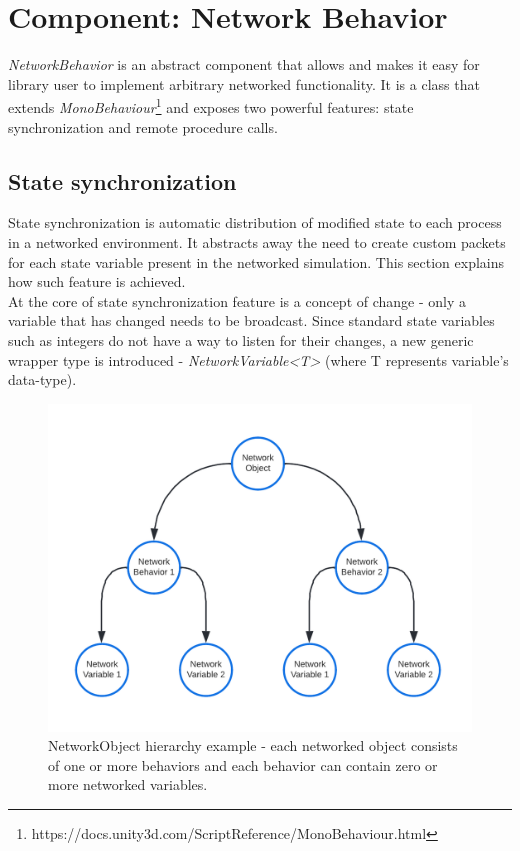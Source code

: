\documentclass[times, utf8, diplomski]{fer}
\begin{document}
\section{Component: Network Behavior}
\textit{NetworkBehavior} is an abstract component that allows and makes it easy for library user to implement arbitrary networked functionality. It is a class that extends \textit{MonoBehaviour}\footnote{https://docs.unity3d.com/ScriptReference/MonoBehaviour.html} and exposes two powerful features: state synchronization and remote procedure calls.

\subsection{State synchronization}
State synchronization is automatic distribution of modified state to each process in a networked environment. It abstracts away the need to create custom packets for each state variable present in the networked simulation. This section explains how such feature is achieved. \\

At the core of state synchronization feature is a concept of change - only a variable that has changed needs to be broadcast. Since standard state variables such as integers do not have a way to listen for their changes, a new generic wrapper type is introduced - \textit{NetworkVariable<T>} (where T represents variable's data-type).\\

\begin{figure}[H]
	\centering
	\includegraphics[scale=0.3]{NetworkObject-tree}
	\caption{NetworkObject hierarchy example - each networked object consists of one or more behaviors and each behavior can contain zero or more networked variables.}
\end{figure}
\end{document}
